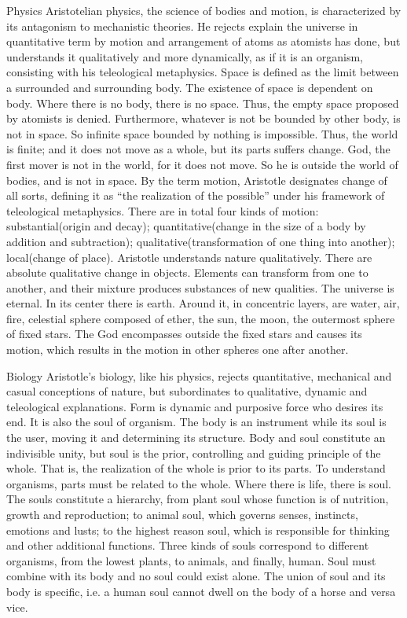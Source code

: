 \documentclass[11pt]{article}
\begin{document}
Physics
  Aristotelian physics, the science of bodies and motion, is characterized by its antagonism to mechanistic theories. He rejects explain the universe in quantitative term by motion and arrangement of atoms as atomists has done, but understands it qualitatively and more dynamically, as if it is an organism, consisting with his teleological metaphysics.
  Space is defined as the limit between a surrounded and surrounding body. The existence of space is dependent on body. Where there is no body, there is no space. Thus, the empty space proposed by atomists is denied. Furthermore, whatever is not be bounded by other body, is not in space. So infinite space bounded by nothing is impossible. Thus, the world is finite; and it does not move as a whole, but its parts suffers change. God, the first mover is not in the world, for it does not move. So he is outside the world of bodies, and is not in space. 
  By the term motion, Aristotle designates change of all sorts, defining it as “the realization of the possible” under his framework of teleological metaphysics. There are in total four kinds of motion: substantial(origin and decay); quantitative(change in the size of a body by addition and subtraction); qualitative(transformation of one thing into another); local(change of place). Aristotle understands nature qualitatively. There are absolute qualitative change in objects. Elements can transform from one to another, and their mixture produces substances of new qualities.
  The universe is eternal. In its center there is earth. Around it, in concentric layers, are water, air, fire, celestial sphere composed of ether, the sun, the moon, the outermost sphere of fixed stars. The God encompasses outside the fixed stars and causes its motion, which results in the motion in other spheres one after another.

Biology
  Aristotle’s biology, like his physics, rejects quantitative, mechanical and casual conceptions of nature, but subordinates to qualitative, dynamic and teleological explanations. Form is dynamic and purposive force who desires its end. It is also the soul of organism. The body is an instrument while its soul is the user, moving it and determining its structure. Body and soul constitute an indivisible unity, but soul is the prior, controlling and guiding principle of the whole. That is, the realization of the whole is prior to its parts. To understand organisms, parts must be related to the whole.
  Where there is life, there is soul. The souls constitute a hierarchy, from plant soul whose function is of nutrition, growth and reproduction; to animal soul, which governs senses, instincts, emotions and lusts; to the highest reason soul, which is responsible for thinking and other additional functions. Three kinds of souls correspond to different organisms, from the lowest plants, to animals, and finally, human. Soul must combine with its body and no soul could exist alone. The union of soul and its body is specific, i.e. a human soul cannot dwell on the body of a horse and versa vice.
\end{document}

